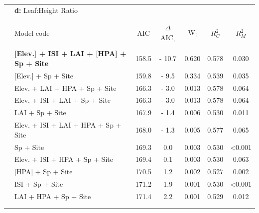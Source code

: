 \documentclass[a4paper,10pt,]{report}
\begin{document}
\begin{table}[H] \centering 
  \label{} 
\begin{tabular}{@{\extracolsep{5pt}} clSSSSS} 
&\textbf{\Large{d:}}  Leaf:Height Ratio &&&&&\\
\\[-1.8ex]\hline 
\hline \\[-1.8ex] 
 & Model code  & {AIC} & {$\Delta$AIC\textsubscript{r}} & {W\textsubscript{i}} & {$R_C^2$} & {$R_M^2$} \\ 
\hline \\[-1.8ex] 
 & \textbf{[Elev.] + ISI + LAI + [HPA] + Sp + Site} &  158.5  &   - 10.7  &  0.620  &  0.578  &  0.030  \\ 
 & [Elev.] + Sp + Site &  159.8  &   - 9.5  &  0.334  &  0.539  &  0.035  \\ 
 & Elev. + LAI + HPA + Sp + Site &  166.3  &   - 3.0  &  0.013  &  0.578  &  0.064  \\ 
 & Elev. + ISI + LAI + Sp + Site &  166.3  &   - 3.0  &  0.013  &  0.578  &  0.064  \\ 
 & LAI + Sp + Site &  167.9  &   - 1.4  &  0.006  &  0.530  &  0.011  \\ 
 & Elev. + ISI + LAI + HPA + Sp + Site &  168.0  &   - 1.3  &  0.005  &  0.577  &  0.065  \\ 
 & Sp + Site &  169.3  &  0.0  &  0.003  &  0.530  &  <0.001  \\ 
 & Elev. + ISI + HPA + Sp + Site &  169.4  &  0.1  &  0.003  &  0.530  &  0.063  \\ 
 & [HPA] + Sp + Site &  170.5  &  1.2  &  0.002  &  0.527  &  0.002  \\ 
 & ISI + Sp + Site &  171.2  &  1.9  &  0.001  &  0.530  &  <0.001  \\ 
 & LAI + HPA + Sp + Site &  171.4  &  2.2  &  0.001  &  0.529  &  0.012  \\ 
\hline \\[-1.8ex] 
\hline\\

\end{tabular} 
\end{table} 
\end{document}
